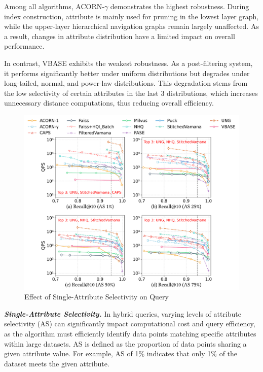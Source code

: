 \documentclass[sigconf, nonacm]{acmart}
\begin{document}
	Among all algorithms, ACORN-\(\gamma\) demonstrates the highest robustness. During index construction, attribute is mainly used for pruning in the lowest layer graph, while the upper-layer hierarchical navigation graphs remain largely unaffected. As a result, changes in attribute distribution have a limited impact on overall performance.
	
	In contrast, VBASE exhibits the weakest robustness. As a post-filtering system, it performs significantly better under uniform distributions but degrades under long-tailed, normal, and power-law distributions. This degradation stems from the low selectivity of certain attributes in the last 3 distributions, which increases unnecessary distance computations, thus reducing overall efficiency.
	
	\begin{figure}
		\centering
		\setlength{\abovecaptionskip}{0.1cm}
		\setlength{\belowcaptionskip}{-0.1cm}
		\includegraphics[width=\columnwidth]{figures/exp/exp_5_1_1_SingleLabel_1thread.pdf}
		\caption{Effect of Single-Attribute Selectivity on Query}
		\label{fig:exp_5_1_1_SingleLabel_1thread}
	\end{figure}
	
	
	\textit{\textbf{Single-Attribute Selectivity.}}
	In hybrid queries, varying levels of attribute selectivity (AS) can significantly impact computational cost and query efficiency, as the algorithm must efficiently identify data points matching specific attributes within large datasets. AS is defined as the proportion of data points sharing a given attribute value. For example, AS of 1\% indicates that only 1\% of the dataset meets the given attribute. 
	
\end{document}
